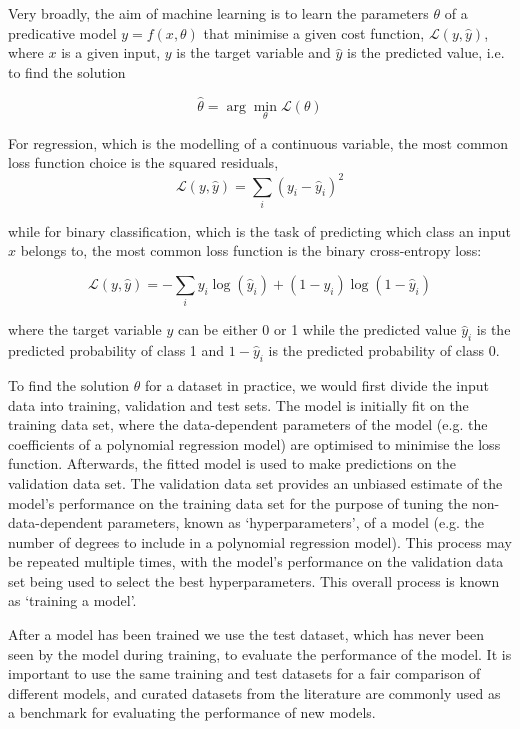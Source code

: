 Very broadly, the aim of machine learning is to learn the parameters $\theta$ of a predicative model $y = f (x, \theta)$ that minimise a given cost function, $\mathcal{L}(y, \hat{y})$, where $x$ is a given input, $y$ is the target variable and $\hat{y}$ is the predicted value, i.e. to find the solution

\begin{equation}
    \hat{\theta} = \arg\min_{\theta} \mathcal{L}(\theta)
\end{equation}

For regression, which is the modelling of a continuous variable, the most common loss function choice is the squared residuals,
\begin{equation}
    \mathcal{L}(y, \hat{y}) = \sum_{i}(y_i - \hat{y}_i)^{2}
\end{equation}

while for binary classification, which is the task of predicting which class an input $x$ belongs to, the most common loss function is the binary cross-entropy loss:

\begin{equation}
    \mathcal{L}(y, \hat{y}) = -\sum_{i}y_i\log(\hat{y}_i) + (1 - y_i)\log(1 - \hat{y}_i)
\end{equation}

where the target variable $y$ can be either 0 or 1 while the predicted value $\hat{y}_i$ is the predicted probability of class 1 and $1-\hat{y}_i$ is the predicted probability of class 0.

To find the solution $\hat{\theta}$ for a dataset in practice, we would first divide the input data into training, validation and test sets. The model is initially fit on the training data set, where the data-dependent parameters of the model (e.g. the coefficients of a polynomial regression model) are optimised to minimise the loss function. Afterwards, the fitted model is used to make predictions on the validation data set. The validation data set provides an unbiased estimate of the model's performance on the training data set for the purpose of tuning the non-data-dependent parameters, known as `hyperparameters', of a model (e.g. the number of degrees to include in a polynomial regression model). This process may be repeated multiple times, with the model's performance on the validation data set being used to select the best hyperparameters. This overall process is known as `training a model'.

After a model has been trained we use the test dataset, which has never been seen by the model during training, to evaluate the performance of the model. It is important to use the same training and test datasets for a fair comparison of different models, and curated datasets from the literature are commonly used as a benchmark for evaluating the performance of new models.

